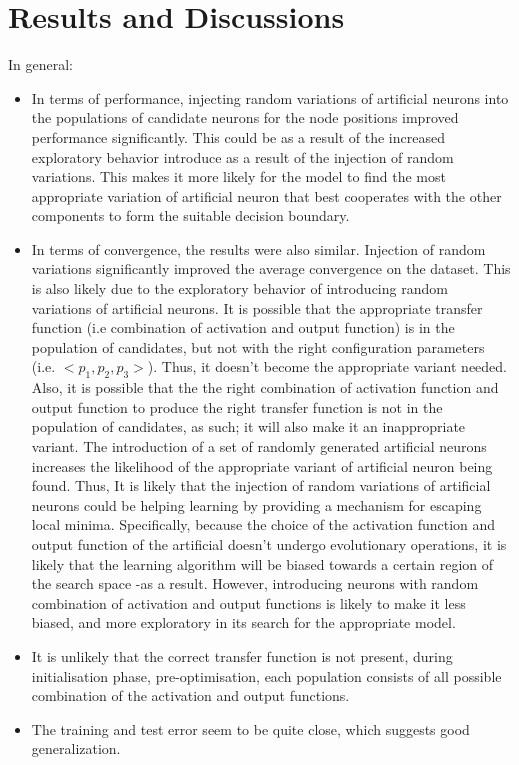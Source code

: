 \documentclass[12pt]{article} %
\begin{document}
\section{Results and Discussions}
In general:
\begin{itemize}
\item In terms of performance, injecting random variations of artificial neurons into the populations of candidate neurons for the node positions improved performance significantly. This could be as a result of the increased exploratory behavior introduce as a result of the injection of random variations. This makes it more likely for the model to find the most appropriate variation of artificial neuron that best cooperates with the other components to form the suitable decision boundary. 

\item In terms of convergence, the results were also similar. Injection of random variations significantly improved the average convergence on the dataset. This is also likely due to the exploratory behavior of introducing random variations of artificial neurons. It is possible that the appropriate transfer function (i.e combination of activation and output function) is in the population of candidates, but not with the right configuration parameters (i.e. $<p_1,p_2,p_3>$). Thus, it doesn't become the appropriate variant needed. Also, it is possible that the the right combination of activation function and output function to produce the right transfer function is not in the population of candidates, as such; it will also make it an inappropriate variant. The introduction of a set of randomly generated artificial neurons increases the likelihood of the appropriate variant of artificial neuron being found. Thus, It is likely that the injection of random variations of artificial neurons could be helping learning by providing a mechanism for escaping local minima. Specifically, because the choice of the activation function and output function of the artificial doesn't undergo evolutionary operations, it is likely that the learning algorithm will be biased towards a certain region of the search space -as a result. However, introducing neurons with random combination of activation and output functions is likely to make it less biased, and more exploratory in its search for the appropriate model.

\item It is unlikely that the correct transfer function is not present, during initialisation phase, pre-optimisation, each population consists of all possible combination of the activation and output functions. 

\item The training and test error seem to be quite close, which suggests good generalization.

\end{itemize}
\end{document}
